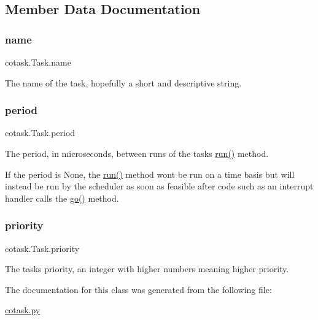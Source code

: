 \subsection{Member Data Documentation}
\mbox{\label{classcotask_1_1_task_ab54e069dd0b4f0a2f8e7f00c94998a10}} 
\subsubsection{\texorpdfstring{name}{name}}
{\footnotesize\ttfamily cotask.\+Task.\+name}



The name of the task, hopefully a short and descriptive string. 

\mbox{\label{classcotask_1_1_task_a44f980f61f1908764c6821fa886590ca}} 
\subsubsection{\texorpdfstring{period}{period}}
{\footnotesize\ttfamily cotask.\+Task.\+period}



The period, in microseconds, between runs of the task\textquotesingle{}s {\ttfamily \mbox{\hyperlink{print__task_8py_abe2a60b9d48d38a4c9ec85bd891aafca}{run()}}} method. 

If the period is {\ttfamily None}, the {\ttfamily \mbox{\hyperlink{print__task_8py_abe2a60b9d48d38a4c9ec85bd891aafca}{run()}}} method won\textquotesingle{}t be run on a time basis but will instead be run by the scheduler as soon as feasible after code such as an interrupt handler calls the {\ttfamily \mbox{\hyperlink{classcotask_1_1_task_a78e74d18a5ba94074c2b5309394409a5}{go()}}} method. \mbox{\label{classcotask_1_1_task_aeced93c7b7d23e33de9693d278aef88b}} 
\subsubsection{\texorpdfstring{priority}{priority}}
{\footnotesize\ttfamily cotask.\+Task.\+priority}



The task\textquotesingle{}s priority, an integer with higher numbers meaning higher priority. 



The documentation for this class was generated from the following file\+:\begin{DoxyCompactItemize}
\item 
\mbox{\hyperlink{cotask_8py}{cotask.\+py}}\end{DoxyCompactItemize}

